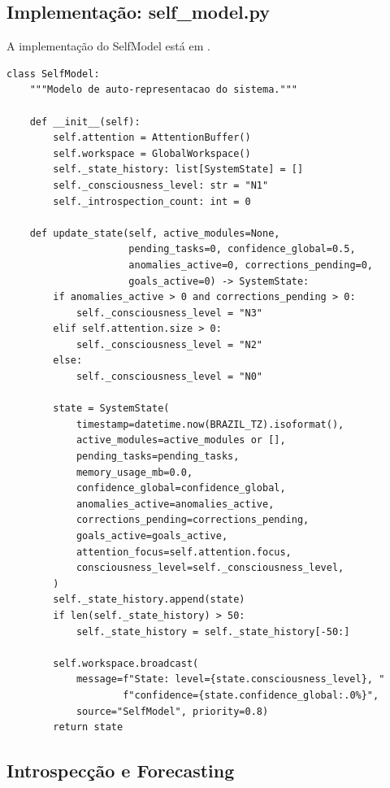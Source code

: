 \subsection{Implementação: self\_model.py}

A implementação do SelfModel está em
.

\begin{lstlisting}[style=pythonstyle, caption={SelfModel: arquitetura N0-N3 (self\_model.py:180-250)}]
class SelfModel:
    """Modelo de auto-representacao do sistema."""

    def __init__(self):
        self.attention = AttentionBuffer()
        self.workspace = GlobalWorkspace()
        self._state_history: list[SystemState] = []
        self._consciousness_level: str = "N1"
        self._introspection_count: int = 0

    def update_state(self, active_modules=None,
                     pending_tasks=0, confidence_global=0.5,
                     anomalies_active=0, corrections_pending=0,
                     goals_active=0) -> SystemState:
        if anomalies_active > 0 and corrections_pending > 0:
            self._consciousness_level = "N3"
        elif self.attention.size > 0:
            self._consciousness_level = "N2"
        else:
            self._consciousness_level = "N0"

        state = SystemState(
            timestamp=datetime.now(BRAZIL_TZ).isoformat(),
            active_modules=active_modules or [],
            pending_tasks=pending_tasks,
            memory_usage_mb=0.0,
            confidence_global=confidence_global,
            anomalies_active=anomalies_active,
            corrections_pending=corrections_pending,
            goals_active=goals_active,
            attention_focus=self.attention.focus,
            consciousness_level=self._consciousness_level,
        )
        self._state_history.append(state)
        if len(self._state_history) > 50:
            self._state_history = self._state_history[-50:]

        self.workspace.broadcast(
            message=f"State: level={state.consciousness_level}, "
                    f"confidence={state.confidence_global:.0%}",
            source="SelfModel", priority=0.8)
        return state
\end{lstlisting}

\subsection{Introspecção e Forecasting}

